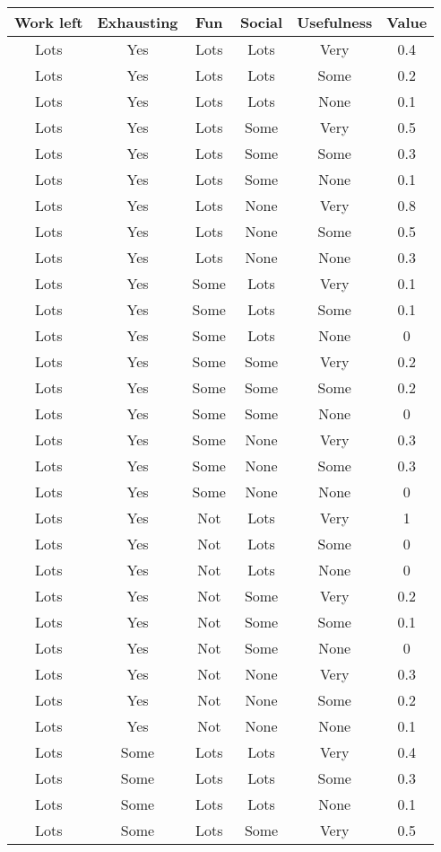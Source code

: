 \begin{tabular}{|c|c|c|c|c|c|}
\hline
Work left	&	Exhausting	&	Fun	&	Social	&	Usefulness	&	Value	\\
\hline
Lots	&	Yes	&	Lots	&	Lots	&	Very	&	0.4	\\
Lots	&	Yes	&	Lots	&	Lots	&	Some	&	0.2	\\
Lots	&	Yes	&	Lots	&	Lots	&	None	&	0.1	\\
Lots	&	Yes	&	Lots	&	Some	&	Very	&	0.5	\\
Lots	&	Yes	&	Lots	&	Some	&	Some	&	0.3	\\
Lots	&	Yes	&	Lots	&	Some	&	None	&	0.1	\\
Lots	&	Yes	&	Lots	&	None	&	Very	&	0.8	\\
Lots	&	Yes	&	Lots	&	None	&	Some	&	0.5	\\
Lots	&	Yes	&	Lots	&	None	&	None	&	0.3	\\
Lots	&	Yes	&	Some	&	Lots	&	Very	&	0.1	\\
Lots	&	Yes	&	Some	&	Lots	&	Some	&	0.1	\\
Lots	&	Yes	&	Some	&	Lots	&	None	&	0	\\
Lots	&	Yes	&	Some	&	Some	&	Very	&	0.2	\\
Lots	&	Yes	&	Some	&	Some	&	Some	&	0.2	\\
Lots	&	Yes	&	Some	&	Some	&	None	&	0	\\
Lots	&	Yes	&	Some	&	None	&	Very	&	0.3	\\
Lots	&	Yes	&	Some	&	None	&	Some	&	0.3	\\
Lots	&	Yes	&	Some	&	None	&	None	&	0	\\
Lots	&	Yes	&	Not	&	Lots	&	Very	&	1	\\
Lots	&	Yes	&	Not	&	Lots	&	Some	&	0	\\
Lots	&	Yes	&	Not	&	Lots	&	None	&	0	\\
Lots	&	Yes	&	Not	&	Some	&	Very	&	0.2	\\
Lots	&	Yes	&	Not	&	Some	&	Some	&	0.1	\\
Lots	&	Yes	&	Not	&	Some	&	None	&	0	\\
Lots	&	Yes	&	Not	&	None	&	Very	&	0.3	\\
Lots	&	Yes	&	Not	&	None	&	Some	&	0.2	\\
Lots	&	Yes	&	Not	&	None	&	None	&	0.1	\\
Lots	&	Some	&	Lots	&	Lots	&	Very	&	0.4	\\
Lots	&	Some	&	Lots	&	Lots	&	Some	&	0.3	\\
Lots	&	Some	&	Lots	&	Lots	&	None	&	0.1	\\
Lots	&	Some	&	Lots	&	Some	&	Very	&	0.5	\\

\end{tabular}
